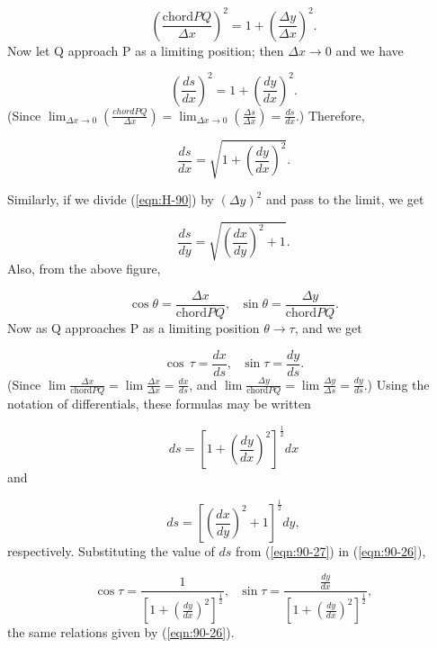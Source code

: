 \[
\left ( \frac{\mbox{chord} PQ}{\Delta x} \right )^2 
= 1 + \left ( \frac{\Delta y}{\Delta x} \right )^2.
\]
Now let Q approach P as a limiting position; then 
$\Delta x \to 0$ and we have

\[
 \left ( \frac{ds}{dx} \right )^2 = 1 + \left ( \frac{dy}{dx} \right )^2.
\]
(Since $\lim_{\Delta x \to 0} \left ( \frac{chord PQ}{\Delta x} \right )
= \lim_{\Delta x \to 0} \left ( \frac{\Delta s}{\Delta x} \right ) 
= \frac{ds}{dx}$.) %
Therefore, 

\begin{equation}
\frac{ds}{dx} = \sqrt{1 + \left ( \frac{dy}{dx} \right )^2}.
\label{eqn:24-90}
\end{equation}

Similarly, if we divide (\ref{eqn:H-90}) by 
$(\Delta y)^2$ and pass to the limit, we get

\[
\frac{ds}{dy} = \sqrt{\left ( \frac{dx}{dy} \right )^2 + 1}.
\]
Also, from the above figure,

\[
    \cos \theta 
= \frac{\Delta x}{\mbox{chord} PQ},\ \ \  \sin \theta 
= \frac{\Delta y}{\mbox{chord} PQ}.
\]
Now as Q approaches P as a limiting position $\theta \to \tau$, and we get

\begin{equation}
\cos\, \tau = \frac{dx}{ds}, \ \ \ \sin \tau = \frac{dy}{ds}.
\label{eqn:90-26}
\end{equation}
(Since %
$\lim \frac{\Delta x}{\mbox{chord} PQ} 
= \lim \frac{\Delta x}{\Delta x} 
= \frac{dx}{ds}$, and 
$\lim \frac{\Delta y}{\mbox{chord} PQ} 
= \lim \frac{\Delta y}{\Delta s} = \frac{dy}{ds}$.)
Using the notation of differentials, these formulas %
may be written

\begin{equation}
ds 
= \left [ 1 + \left ( \frac{dy}{dx} \right )^2 \right ]^{\frac{1}{2}} dx
\label{eqn:90-27}
\end{equation}
and

\begin{equation}
ds = \left [ \left ( \frac{dx}{dy} \right )^2 + 1 \right ]^{\frac{1}{2}} dy,
\label{eqn:28-90}
\end{equation}
respectively.
Substituting the value of $ds$ from (\ref{eqn:90-27}) in (\ref{eqn:90-26}),

\begin{equation}
\cos \tau 
= \frac{1}{\left[ 1 + \left ( \frac{dy}{dx} \right )^2 \right]^{\frac{1}{2}}}, 
\ \ \ 
\sin \tau 
= \frac{\frac{dy}{dx}}{\left [ 
1 + \left ( \frac{dy}{dx} \right )^2 \right ]^{\frac{1}{2}}},
\label{eqn:90-29}
\end{equation}
the same relations given by (\ref{eqn:90-26}).

